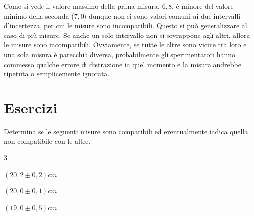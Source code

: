 Come si vede il valore massimo della prima misura, $6,8$, è minore del valore minimo della seconda ($7,0$) dunque non ci sono valori comuni ai due intervalli d'incertezza, per cui le misure sono incompatibili. Questo si può generalizzare al caso di più misure. Se anche un solo intervallo non si sovrappone agli altri, allora le misure sono incompatibili. Ovviamente, se tutte le altre sono vicine tra loro e una sola misura è parecchio diversa, probabilmente gli sperimentatori hanno commesso qualche errore di distrazione in quel momento e la misura andrebbe
 ripetuta o semplicemente ignorata.
 
 \section{Esercizi}
 
\begin{esercizio}
Determina se le seguenti misure sono compatibili ed eventualmente indica quella non compatibile con le altre.
\begin{multicols}{3}
\begin{elenco}
 \item[a)] $\left(20,2 \pm 0,2\right)\si{cm}$\\
 \item[b)] $\left(20,0 \pm 0,1\right)\si{cm}$\\
 \item[c)] $\left(19,0 \pm 0,5\right)\si{cm}$ \\
\end{elenco}
\end{multicols}

\end{esercizio} 
 
